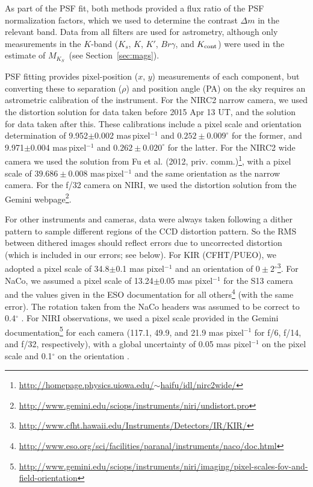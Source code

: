\documentclass[twocolumn]{aastex62}
\newcommand{\mks}{$M_{K_S}$}
\newcommand{\degree}{$^{\circ}$}
\begin{document}
As part of the PSF fit, both methods provided a flux ratio of the PSF normalization factors, which we used to determine the contrast $\Delta m$ in the relevant band. Data from all filters are used for astrometry, although only measurements in the $K$-band ($K_s$, $K$, $K'$, $Br\gamma$, and $K_{\rm{cont}}$) were used in the estimate of \mks\ (see Section~\ref{sec:mags}).

PSF fitting provides pixel-position ($x$, $y$) measurements of each component, but converting these to separation ($\rho$) and position angle (PA) on the sky requires an astrometric calibration of the instrument. For the NIRC2 narrow camera, we used the \citet{Yelda2010} distortion solution for data taken before 2015 Apr 13 UT, and the \citet{2016PASP..128i5004S} solution for data taken after this. These calibrations include a pixel scale and orientation determination of 9.952$\pm$0.002 mas\,pixel$^{-1}$ and $0.252\pm0.009^{\circ}$ for the former, and 9.971$\pm$0.004 mas\,pixel$^{-1}$ and $0.262\pm0.020^{\circ}$ for the latter. For the NIRC2 wide camera we used the solution from Fu et al. (2012, priv. comm.)\footnote{\href{http://homepage.physics.uiowa.edu/~haifu/idl/nirc2wide/}{http://homepage.physics.uiowa.edu/$\sim$haifu/idl/nirc2wide/}}, with a pixel scale of $39.686\pm0.008$ mas\,pixel$^{-1}$ and the same orientation as the narrow camera. For the f/32 camera on NIRI, we used the distortion solution from the Gemini webpage\footnote{\href{http://www.gemini.edu/sciops/instruments/niri/undistort.pro}{http://www.gemini.edu/sciops/instruments/niri/undistort.pro}}. 

For other instruments and cameras, data were always taken following a dither pattern to sample different regions of the CCD distortion pattern. So the RMS between dithered images should reflect errors due to uncorrected distortion (which is included in our errors; see below). For KIR (CFHT/PUEO), we adopted a pixel scale of 34.8$\pm$0.1 mas pixel$^{-1}$ \citep{2003ApJ...589..410S} and an orientation of $0\pm2$\degree \footnote{\href{http://www.cfht.hawaii.edu/Instruments/Detectors/IR/KIR/}{http://www.cfht.hawaii.edu/Instruments/Detectors/IR/KIR/}}. For NaCo, we assumed a pixel scale of 13.24$\pm0.05$ mas pixel$^{-1}$ for the S13 camera \citep{2003A&A...411..157M,2005A&A...435L..13N} and the values given in the ESO documentation for all others\footnote{\href{http://www.eso.org/sci/facilities/paranal/instruments/naco/doc.html}{http://www.eso.org/sci/facilities/paranal/instruments/naco/doc.html}} (with the same error). The rotation taken from the NaCo headers was assumed to be correct to 0.4$^{\circ}$ \citep{Sef2008}. For NIRI observations, we used a pixel scale provided in the Gemini documentation\footnote{\href{http://www.gemini.edu/sciops/instruments/niri/imaging/pixel-scales-fov-and-field-orientation}{http://www.gemini.edu/sciops/instruments/niri/imaging/pixel-scales-fov-and-field-orientation}} for each camera (117.1, 49.9, and 21.9 mas pixel$^{-1}$ for f/6, f/14, and f/32, respectively), with a global uncertainty of 0.05 mas pixel$^{-1}$ on the pixel scale and 0.1$^{\circ}$ on the orientation \citep{2004ApJ...614..235B}. 
\end{document}
